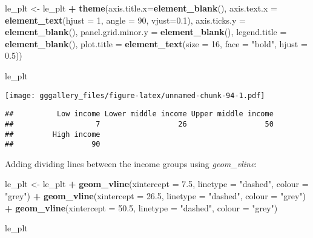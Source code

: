 \documentclass[]{book}
\newenvironment{Shaded}{\begin{snugshade}}{\end{snugshade}}
\newcommand{\DataTypeTok}[1]{\textcolor[rgb]{0.13,0.29,0.53}{#1}}
\newcommand{\DecValTok}[1]{\textcolor[rgb]{0.00,0.00,0.81}{#1}}
\newcommand{\FloatTok}[1]{\textcolor[rgb]{0.00,0.00,0.81}{#1}}
\newcommand{\KeywordTok}[1]{\textcolor[rgb]{0.13,0.29,0.53}{\textbf{#1}}}
\newcommand{\NormalTok}[1]{#1}
\newcommand{\OperatorTok}[1]{\textcolor[rgb]{0.81,0.36,0.00}{\textbf{#1}}}
\newcommand{\StringTok}[1]{\textcolor[rgb]{0.31,0.60,0.02}{#1}}
\begin{document}
\begin{Shaded}
\begin{Highlighting}[]
\NormalTok{le_plt <-}\StringTok{ }\NormalTok{le_plt }\OperatorTok{+}\StringTok{ }
\StringTok{    }\KeywordTok{theme}\NormalTok{(}\DataTypeTok{axis.title.x=}\KeywordTok{element_blank}\NormalTok{(),}
        \DataTypeTok{axis.text.x =} \KeywordTok{element_text}\NormalTok{(}\DataTypeTok{hjust =} \DecValTok{1}\NormalTok{, }\DataTypeTok{angle =} \DecValTok{90}\NormalTok{, }\DataTypeTok{vjust=}\FloatTok{0.1}\NormalTok{),}
        \DataTypeTok{axis.ticks.y =} \KeywordTok{element_blank}\NormalTok{(),}
        \DataTypeTok{panel.grid.minor.y =} \KeywordTok{element_blank}\NormalTok{(),}
        \DataTypeTok{legend.title =} \KeywordTok{element_blank}\NormalTok{(),}
        \DataTypeTok{plot.title =} \KeywordTok{element_text}\NormalTok{(}\DataTypeTok{size =} \DecValTok{16}\NormalTok{, }\DataTypeTok{face =} \StringTok{"bold"}\NormalTok{, }\DataTypeTok{hjust =} \FloatTok{0.5}\NormalTok{))}

\NormalTok{le_plt}
\end{Highlighting}
\end{Shaded}

\texttt{[image: gggallery\_files/figure-latex/unnamed-chunk-94-1.pdf]}

\begin{Shaded}
\end{Shaded}

\begin{verbatim}
##          Low income Lower middle income Upper middle income 
##                   7                  26                  50 
##         High income 
##                  90
\end{verbatim}

Adding dividing lines between the income groups using \emph{geom\_vline}:

\begin{Shaded}
\begin{Highlighting}[]
\NormalTok{le_plt <-}\StringTok{ }\NormalTok{le_plt }\OperatorTok{+}
\StringTok{  }\KeywordTok{geom_vline}\NormalTok{(}\DataTypeTok{xintercept =} \FloatTok{7.5}\NormalTok{, }\DataTypeTok{linetype =} \StringTok{"dashed"}\NormalTok{, }\DataTypeTok{colour =} \StringTok{"grey"}\NormalTok{) }\OperatorTok{+}
\StringTok{  }\KeywordTok{geom_vline}\NormalTok{(}\DataTypeTok{xintercept =} \FloatTok{26.5}\NormalTok{, }\DataTypeTok{linetype =} \StringTok{"dashed"}\NormalTok{, }\DataTypeTok{colour =} \StringTok{"grey"}\NormalTok{) }\OperatorTok{+}
\StringTok{  }\KeywordTok{geom_vline}\NormalTok{(}\DataTypeTok{xintercept =} \FloatTok{50.5}\NormalTok{, }\DataTypeTok{linetype =} \StringTok{"dashed"}\NormalTok{, }\DataTypeTok{colour =} \StringTok{"grey"}\NormalTok{)}

\NormalTok{le_plt }
\end{Highlighting}
\end{Shaded}
\end{document}
